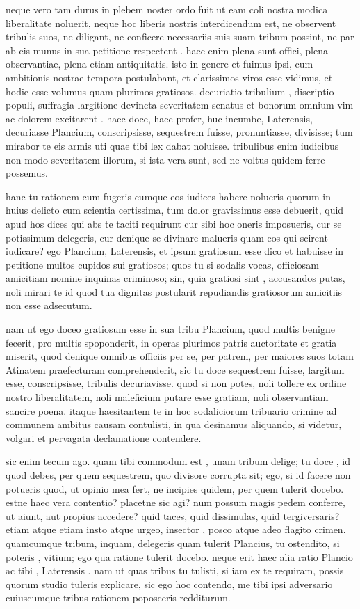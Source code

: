  neque vero tam durus in plebem noster ordo fuit ut eam coli nostra modica liberalitate noluerit, neque hoc liberis nostris interdicendum est, ne observent tribulis suos, ne diligant, ne conficere necessariis suis suam tribum possint, ne par ab eis munus in sua petitione respectent . haec enim plena sunt offici, plena observantiae, plena etiam antiquitatis. isto in genere et fuimus ipsi, cum ambitionis nostrae tempora postulabant, et clarissimos viros esse vidimus, et hodie esse volumus quam plurimos gratiosos. decuriatio tribulium , discriptio populi, suffragia largitione devincta severitatem senatus et bonorum omnium vim ac dolorem excitarent . haec doce, haec profer, huc incumbe, Laterensis, decuriasse Plancium, conscripsisse, sequestrem fuisse, pronuntiasse, divisisse; tum mirabor te eis armis uti quae tibi lex dabat noluisse. tribulibus enim iudicibus non modo severitatem illorum, si ista vera sunt, sed ne voltus quidem ferre possemus.

 hanc tu rationem cum fugeris cumque eos iudices habere nolueris quorum in huius delicto cum scientia certissima, tum dolor gravissimus esse debuerit, quid apud hos dices qui abs te taciti requirunt cur sibi hoc oneris imposueris, cur se potissimum delegeris, cur denique se divinare malueris quam eos qui scirent iudicare? ego Plancium, Laterensis, et ipsum gratiosum esse dico et habuisse in petitione multos cupidos sui gratiosos; quos tu si sodalis vocas, officiosam amicitiam nomine inquinas criminoso; sin, quia gratiosi sint , accusandos putas, noli mirari te id quod tua dignitas postularit repudiandis gratiosorum amicitiis non esse adsecutum.

 nam ut ego doceo gratiosum esse in sua tribu Plancium, quod multis benigne fecerit, pro multis spoponderit, in operas plurimos patris auctoritate et gratia miserit, quod denique omnibus officiis per se, per patrem, per maiores suos totam Atinatem praefecturam comprehenderit, sic tu doce sequestrem fuisse, largitum esse, conscripsisse, tribulis decuriavisse. quod si non potes, noli tollere ex ordine nostro liberalitatem, noli maleficium putare esse gratiam, noli observantiam sancire poena. itaque haesitantem te in hoc sodaliciorum tribuario crimine ad communem ambitus causam contulisti, in qua desinamus aliquando, si videtur, volgari et pervagata declamatione contendere.

 sic enim tecum ago. quam tibi commodum est , unam tribum delige; tu doce , id quod debes, per quem sequestrem, quo divisore corrupta sit; ego, si id facere non potueris quod, ut opinio mea fert, ne incipies quidem, per quem tulerit docebo. estne haec vera contentio? placetne sic agi? num possum magis pedem conferre, ut aiunt, aut propius accedere? quid taces, quid dissimulas, quid tergiversaris? etiam atque etiam insto atque urgeo, insector , posco atque adeo flagito crimen. quamcumque tribum, inquam, delegeris quam tulerit Plancius, tu ostendito, si poteris , vitium; ego qua ratione tulerit docebo. neque erit haec alia ratio Plancio ac tibi , Laterensis . nam ut quas tribus tu tulisti, si iam ex te requiram, possis quorum studio tuleris explicare, sic ego hoc contendo, me tibi ipsi adversario cuiuscumque tribus rationem poposceris redditurum.

